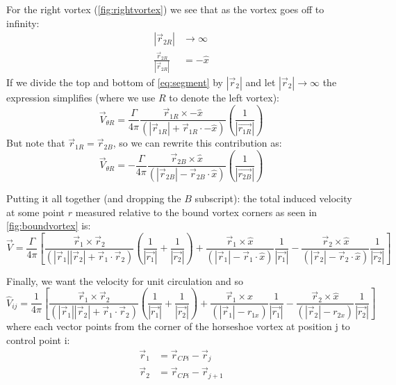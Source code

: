 \documentclass{article}
\begin{document}
For the right vortex (\cref{fig:rightvortex}) 
we see that as the vortex goes off to infinity:
\begin{align}
|\vec{r}_{2R}| &\rightarrow \infty\\
\frac{\vec{r}_{2R}}{|\vec{r}_{2R}|} &= -\hat{x}
\end{align}
If we divide the top and bottom of \cref{eq:segment} by $|\vec{r}_2|$ and let $|\vec{r}_2| \rightarrow \infty$ the expression simplifies (where we use $R$ to denote the left vortex):
\begin{equation}
\vec{V}_{\theta R} = \frac{\Gamma}{4 \pi} \frac{\vec{r}_{1R} \times -\hat{x}}{(|\vec{r}_{1R}| + \vec{r}_{1R} \cdot -\hat{x})} \left(\frac{1}{|\vec{r_{1R}}|} \right)
\end{equation}
But note that $\vec{r}_{1R} = \vec{r}_{2B}$, so we can rewrite this contribution as:
\begin{equation}
\vec{V}_{\theta R} = -\frac{\Gamma}{4 \pi} \frac{\vec{r}_{2B} \times \hat{x}}{(|\vec{r}_{2B}| - \vec{r}_{2B} \cdot \hat{x})} \left(\frac{1}{|\vec{r_{2B}}|} \right)
\end{equation}

Putting it all together (and dropping the $B$ subscript): the total induced velocity at some point $r$ measured relative to the bound vortex corners as seen in \cref{fig:boundvortex} is:
\begin{equation}
\vec{V} = 
\frac{\Gamma}{4 \pi} 
\left[
\frac{\vec{r}_{1} \times \vec{r}_{2}}{(|\vec{r}_{1}||\vec{r}_{2}| + \vec{r}_{1} \cdot \vec{r}_{2})} \left(\frac{1}{|\vec{r_{1}}|} + \frac{1}{|\vec{r_{2}}|} \right)
+
\frac{\vec{r}_{1} \times \hat{x}}{(|\vec{r}_{1}| - \vec{r}_{1} \cdot \hat{x})} \frac{1}{|\vec{r_{1}}|} 
-
\frac{\vec{r}_{2} \times \hat{x}}{(|\vec{r}_{2}| - \vec{r}_{2} \cdot \hat{x})} \frac{1}{|\vec{r_{2}}|} 
\right]
\end{equation}

Finally, we want the velocity for unit circulation and so 
\begin{equation}
\hat{V}_{ij} = 
\frac{1}{4 \pi} 
\left[
\frac{\vec{r}_{1} \times \vec{r}_{2}}{(|\vec{r}_{1}||\vec{r}_{2}| + \vec{r}_{1} \cdot \vec{r}_{2})} \left(\frac{1}{|\vec{r_{1}}|} + \frac{1}{|\vec{r_{2}}|} \right)
+
\frac{\vec{r}_{1} \times \hat{x}}{(|\vec{r}_{1}| - r_{1x})} \frac{1}{|\vec{r_{1}}|} 
-
\frac{\vec{r}_{2} \times \hat{x}}{(|\vec{r}_{2}| - r_{2x} )} \frac{1}{|\vec{r_{2}}|} 
\right]
\end{equation}
where each vector points from the corner of the horseshoe vortex at position j to control point i:
\begin{align}
\vec{r}_1 &= \vec{r}_{CPi} - \vec{r}_{j}\\
\vec{r}_2 &= \vec{r}_{CPi} - \vec{r}_{j+1}
\end{align}
\end{document}
